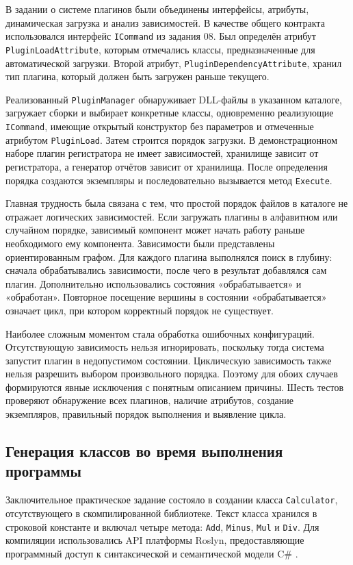 В задании о системе плагинов были объединены интерфейсы, атрибуты, динамическая загрузка и анализ зависимостей. В качестве общего контракта использовался интерфейс \texttt{ICommand} из задания 08. Был определён атрибут \texttt{PluginLoadAttribute}, которым отмечались классы, предназначенные для автоматической загрузки. Второй атрибут, \texttt{PluginDependencyAttribute}, хранил тип плагина, который должен быть загружен раньше текущего.

Реализованный \texttt{PluginManager} обнаруживает DLL-файлы в указанном каталоге, загружает сборки и выбирает конкретные классы, одновременно реализующие \texttt{ICommand}, имеющие открытый конструктор без параметров и отмеченные атрибутом \texttt{PluginLoad}. Затем строится порядок загрузки. В демонстрационном наборе плагин регистратора не имеет зависимостей, хранилище зависит от регистратора, а генератор отчётов зависит от хранилища. После определения порядка создаются экземпляры и последовательно вызывается метод \texttt{Execute}.

Главная трудность была связана с тем, что простой порядок файлов в каталоге не отражает логических зависимостей. Если загружать плагины в алфавитном или случайном порядке, зависимый компонент может начать работу раньше необходимого ему компонента. Зависимости были представлены ориентированным графом. Для каждого плагина выполнялся поиск в глубину: сначала обрабатывались зависимости, после чего в результат добавлялся сам плагин. Дополнительно использовались состояния «обрабатывается» и «обработан». Повторное посещение вершины в состоянии «обрабатывается» означает цикл, при котором корректный порядок не существует.

Наиболее сложным моментом стала обработка ошибочных конфигураций. Отсутствующую зависимость нельзя игнорировать, поскольку тогда система запустит плагин в недопустимом состоянии. Циклическую зависимость также нельзя разрешить выбором произвольного порядка. Поэтому для обоих случаев формируются явные исключения с понятным описанием причины. Шесть тестов проверяют обнаружение всех плагинов, наличие атрибутов, создание экземпляров, правильный порядок выполнения и выявление цикла.

\subsection{Генерация классов во время выполнения программы}

Заключительное практическое задание состояло в создании класса \texttt{Calculator}, отсутствующего в скомпилированной библиотеке. Текст класса хранился в строковой константе и включал четыре метода: \texttt{Add}, \texttt{Minus}, \texttt{Mul} и \texttt{Div}. Для компиляции использовались API платформы Roslyn, предоставляющие программный доступ к синтаксической и семантической модели C\# \cite{roslyn}.

